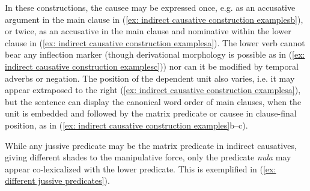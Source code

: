 In these constructions, the causee may be expressed once, e.g. as an accusative argument in the main clause in (\ref{ex: indirect causative construction examplesb}), or twice, as an accusative in the main clause and nominative within the lower clause in (\ref{ex: indirect causative construction examplesa}). The lower verb cannot bear any inflection marker (though derivational morphology is possible as in (\ref{ex: indirect causative construction examplesc})) nor can it be modified by temporal adverbs or negation. The position of the dependent unit also varies, i.e. it may appear extraposed to the right (\ref{ex: indirect causative construction examplesa}), but the sentence can display the canonical word order of main clauses, when the unit is embedded and followed by the matrix predicate or causee in clause-final position, as in (\ref{ex: indirect causative construction examples}b--c).

While any jussive predicate may be the matrix predicate in indirect causatives, giving different shades to the manipulative force, only the predicate \textit{nula} may appear co-lexicalized with the lower predicate. This is exemplified in (\ref{ex: different jussive predicates}).

\ea\label{ex: different jussive predicates}


